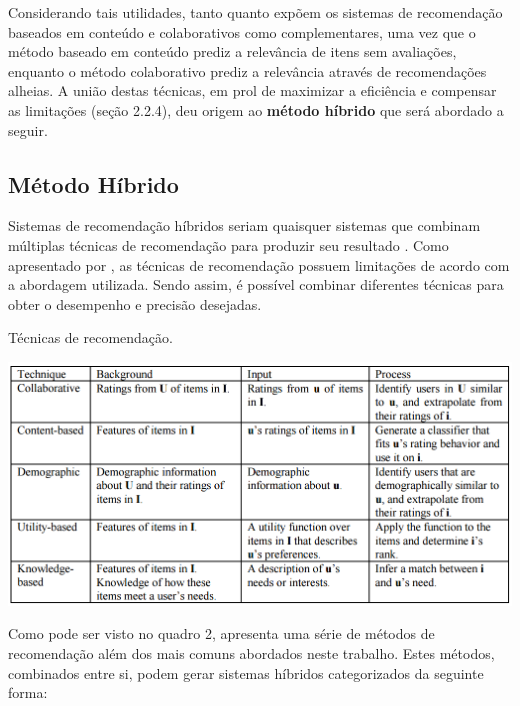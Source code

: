 \documentclass[12pt, openright, oneside, a4paper, brazil]{abntex2}
\begin{document}
Considerando tais utilidades, tanto  quanto  expõem os sistemas de recomendação baseados em conteúdo e colaborativos como complementares, uma vez que o método baseado em conteúdo prediz a relevância de itens sem avaliações, enquanto o método colaborativo prediz a relevância através de recomendações alheias. A união destas técnicas, em prol de maximizar a eficiência e compensar as limitações (seção 2.2.4), deu origem ao \textbf{método híbrido} que será abordado a seguir.

\subsection{Método Híbrido}

Sistemas de recomendação híbridos seriam quaisquer sistemas que combinam múltiplas técnicas de recomendação para produzir seu resultado \cite{burke2002hybrid, burke2007hybrid}. Como apresentado por , as técnicas de recomendação possuem limitações de acordo com a abordagem utilizada. Sendo assim, é possível combinar diferentes técnicas para obter o desempenho e precisão desejadas.

\begin{quadro}[h!tp]
	\caption{\label{recommender_systems}Técnicas de recomendação.}
	\begin{center}
		\includegraphics[scale=0.6]{images/recommender_systems.png}
	\end{center}
\end{quadro}

Como pode ser visto no quadro 2,  apresenta uma série de métodos de recomendação além dos mais comuns abordados neste trabalho. Estes métodos, combinados entre si, podem gerar sistemas híbridos categorizados da seguinte forma:
\end{document}
